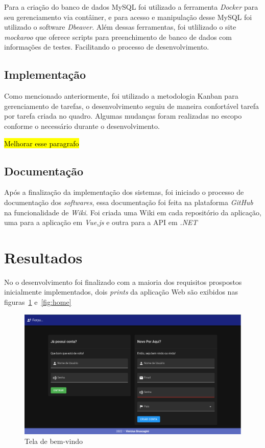 \documentclass[12pt]{article}
\begin{document}
Para a criação do banco de dados MySQL foi utilizado a ferramenta \textit{Docker} para
seu gerenciamento via contâiner, e para acesso e manipulação desse MySQL foi utilizado o software \textit{Dbeaver}.
Além dessas ferramentas, foi utlilizado o site \textit{mockaroo} que oferece scripts para preenchimento
de banco de dados com informações de testes. Facilitando o processo de desenvolvimento.

\subsection{Implementação}

Como mencionado anteriormente, foi utilizado a metodologia Kanban para gerenciamento
de tarefas, o desenvolvimento seguiu de maneira confortável tarefa por tarefa
criada no quadro. Algumas mudanças foram realizadas no escopo conforme o necessário durante o desenvolvimento.

\hl{Melhorar esse paragrafo}

\subsection{Documentação}

Após a finalização da implementação dos sistemas, foi iniciado o processo de documentação
dos \textit{softwares}, essa documentação foi feita na plataforma \textit{GitHub} na funcionalidade
de \textit{Wiki}. Foi criada uma Wiki em cada repositório da aplicação, uma para a aplicação em \textit{Vue,js}
e outra para a API em \textit{.NET}

\section{Resultados}

No o desenvolvimento foi finalizado com a maioria dos
requisitos prospostos inicialmente implementados, dois \textit{prints} da aplicação
Web são exibidos nas figuras~\ref{fig:welcome} e~\ref{fig:home}

\begin{figure}[H]
    \centering
    \includegraphics[width=1\textwidth]{prints/welcome.png}
    \caption{Tela de bem-vindo}\label{fig:welcome}
\end{figure}
\end{document}
